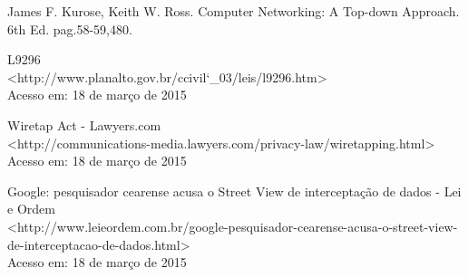\newpage

\begin{thebibliography}{9}


		James F. Kurose, Keith W. Ross. Computer Networking: A Top-down Approach. 6th Ed. pag.58-59,480.

		L9296\\
		\textless{http://www.planalto.gov.br/ccivil\char`_03/leis/l9296.htm}\textgreater\\
		Acesso em: 18 de março de 2015

		Wiretap Act - Lawyers.com\\
		\textless{http://communications-media.lawyers.com/privacy-law/wiretapping.html}\textgreater\\
		Acesso em: 18 de março de 2015

		Google: pesquisador cearense acusa o Street View de interceptação de dados - Lei e Ordem\\
		\textless{http://www.leieordem.com.br/google-pesquisador-cearense-acusa-o-street-view-de-interceptacao-de-dados.html}\textgreater\\
		Acesso em: 18 de março de 2015

\end{thebibliography}

